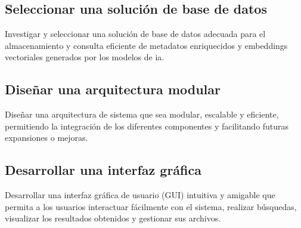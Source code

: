 \subsection{Seleccionar una solución de base de datos}
Investigar y seleccionar una solución de base de datos adecuada para el almacenamiento y consulta eficiente de metadatos enriquecidos y embeddings vectoriales generados por los modelos de \gls{ia}.
\subsection{Diseñar una arquitectura modular}
Diseñar una arquitectura de sistema que sea modular, escalable y eficiente, permitiendo la integración de los diferentes componentes y facilitando futuras expansiones o mejoras.
\subsection{Desarrollar una interfaz gráfica}
Desarrollar una interfaz gráfica de usuario (GUI) intuitiva y amigable que permita a los usuarios interactuar fácilmente con el sistema, realizar búsquedas, visualizar los resultados obtenidos y gestionar sus archivos.
